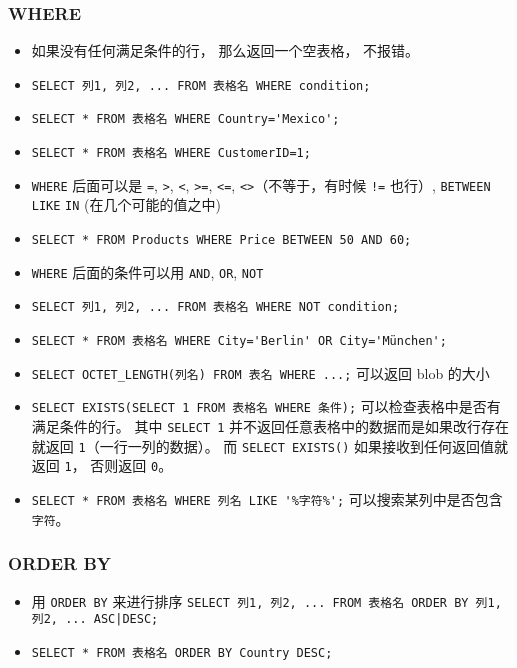 \subsubsection{WHERE}
\begin{itemize}
\item 如果没有任何满足条件的行， 那么返回一个空表格， 不报错。
\item \verb`SELECT 列1, 列2, ... FROM 表格名 WHERE condition;`
\item \verb`SELECT * FROM 表格名 WHERE Country='Mexico';`
\item \verb`SELECT * FROM 表格名 WHERE CustomerID=1;`
\item \verb`WHERE` 后面可以是 \verb`=`, \verb`>`, \verb`<`, \verb`>=`, \verb`<=`, \verb`<>`（不等于，有时候 \verb`!=` 也行）, \verb`BETWEEN` \verb`LIKE` \verb`IN` (在几个可能的值之中)
\item \verb`SELECT * FROM Products WHERE Price BETWEEN 50 AND 60;`
\item \verb`WHERE` 后面的条件可以用 \verb`AND`, \verb`OR`, \verb`NOT`
\item \verb`SELECT 列1, 列2, ... FROM 表格名 WHERE NOT condition;`
\item \verb`SELECT * FROM 表格名 WHERE City='Berlin' OR City='München';`
\item \verb`SELECT OCTET_LENGTH(列名) FROM 表名 WHERE ...;` 可以返回 blob 的大小
\item \verb|SELECT EXISTS(SELECT 1 FROM 表格名 WHERE 条件);| 可以检查表格中是否有满足条件的行。 其中 \verb|SELECT 1| 并不返回任意表格中的数据而是如果改行存在就返回 \verb|1|（一行一列的数据）。 而 \verb|SELECT EXISTS()| 如果接收到任何返回值就返回 \verb|1|， 否则返回 \verb|0|。
\item \verb|SELECT * FROM 表格名 WHERE 列名 LIKE '%字符%';| 可以搜索某列中是否包含 \verb|字符|。
\end{itemize}

\subsubsection{ORDER BY}
\begin{itemize}
\item 用 \verb`ORDER BY` 来进行排序 \verb`SELECT 列1, 列2, ... FROM 表格名 ORDER BY 列1, 列2, ... ASC|DESC;`
\item \verb`SELECT * FROM 表格名 ORDER BY Country DESC;`
\end{itemize}

